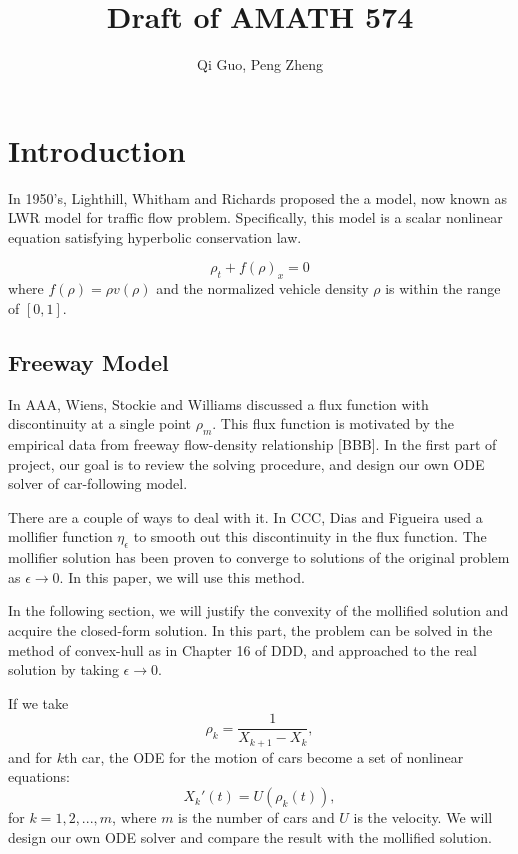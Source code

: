 \documentclass[10pt]{article}
\title{\textbf{Draft of AMATH 574}}
\author{Qi Guo, Peng Zheng}
\date{}
\begin{document}
\maketitle
\section{Introduction}

In 1950's, Lighthill, Whitham and Richards proposed the a model, now known as LWR model for traffic flow problem. Specifically, this model is a scalar nonlinear equation satisfying hyperbolic conservation law.

\[
\rho_t+f(\rho)_x=0
\]
where $f(\rho)=\rho v(\rho)$ and the normalized vehicle density $\rho$ is within the range of $[0,1]$.

\subsection{Freeway Model}

In AAA, Wiens, Stockie and Williams discussed a flux function with discontinuity at a single point $\rho_m$. This flux function is motivated by the empirical data from freeway flow-density relationship [BBB]. In the first part of project, our goal is to review the solving procedure, and design our own ODE solver of car-following model.

There are a couple of ways to deal with it. In CCC, Dias and Figueira used a mollifier function $\eta_\epsilon$ to smooth out this discontinuity in the flux function. The mollifier solution has been proven to converge to solutions of the original problem as $\epsilon\rightarrow 0$. In this paper, we will use this method.

In the following section, we will justify the convexity of the mollified solution and acquire the closed-form solution. In this part, the problem can be solved in the method of convex-hull as in Chapter 16 of DDD, and approached to the real solution by taking $\epsilon \rightarrow 0$.

If we take
\[\rho_k=\frac{1}{X_{k+1}-X_{k}},\]
and for $k$th car, the ODE for the motion of cars become a set of nonlinear equations:
\[
X_k'(t)=U(\rho_k(t)),
\]
for $k=1,2,...,m$, where $m$ is the number of cars and $U$ is the velocity. We will design our own ODE solver and compare the result with the mollified solution.
\end{document}
